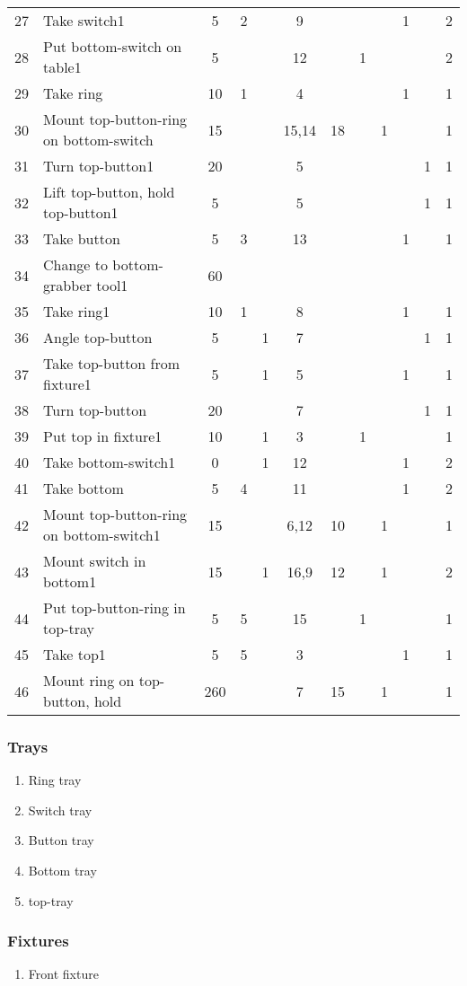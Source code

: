 \documentclass[10pt,a4paper]{report}
\begin{document}
\begin{landscape}
\begin{tabular}{clcccccccccc}
27&Take switch1&5&2&&9&&&&1&&2\\
28&Put bottom-switch on table1&5&&&12&&1&&&&2\\
29&Take ring&10&1&&4&&&&1&&1\\
30&Mount top-button-ring on bottom-switch&15&&&15,14&18&&1&&&1\\
31&Turn top-button1&20&&&5&&&&&1&1\\
32&Lift top-button, hold top-button1&5&&&5&&&&&1&1\\
33&Take button&5&3&&13&&&&1&&1\\
34&Change to bottom-grabber tool1&60&&&&&&&&&\\
35&Take ring1&10&1&&8&&&&1&&1\\
36&Angle top-button&5&&1&7&&&&&1&1\\
37&Take top-button from fixture1&5&&1&5&&&&1&&1\\
38&Turn top-button&20&&&7&&&&&1&1\\
39&Put top in fixture1&10&&1&3&&1&&&&1\\
40&Take bottom-switch1&0&&1&12&&&&1&&2\\
41&Take bottom&5&4&&11&&&&1&&2\\
42&Mount top-button-ring on bottom-switch1&15&&&6,12&10&&1&&&1\\
43&Mount switch in bottom1&15&&1&16,9&12&&1&&&2\\
44&Put top-button-ring in top-tray&5&5&&15&&1&&&&1\\
45&Take top1&5&5&&3&&&&1&&1\\
46&Mount ring on top-button, hold&260&&&7&15&&1&&&1\\
\end{tabular}
\end{landscape}

\subsubsection*{Trays}
\begin{enumerate}
\item Ring tray
\item Switch tray
\item Button tray
\item Bottom tray
\item top-tray
\end{enumerate}

\subsubsection*{Fixtures}
\begin{enumerate}
\item Front fixture
\end{enumerate}
\end{document}
